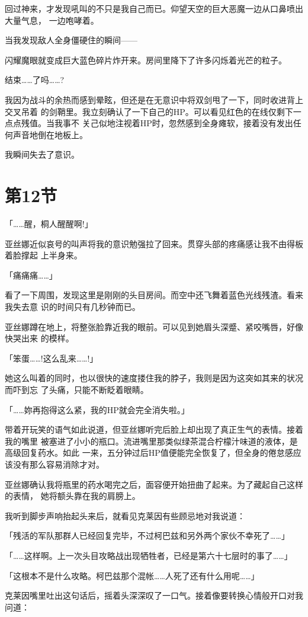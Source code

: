 \documentclass[11pt]{book}
\begin{document}
回过神来，才发现吼叫的不只是我自己而已。仰望天空的巨大恶魔一边从口鼻喷出大量气息，
一边咆哮着。

当我发现敌人全身僵硬住的瞬间——

闪耀魔眼就变成巨大蓝色碎片炸开来。房间里降下了许多闪烁着光芒的粒子。

结束……了吗……?

我因为战斗的余热而感到晕眩，但还是在无意识中将双剑甩了一下，同时收进背上交叉吊着
的剑鞘里。我立刻确认了一下自己的HP。可以看见红色的在线仅剩下一点点残值。当我事不
关己似地注视着HP时，忽然感到全身瘫软，接着没有发出任何声音地倒在地板上。

我瞬间失去了意识。
\section{第12节}
\label{sec:org06a39b8}
「……醒，桐人醒醒啊!」

亚丝娜近似哀号的叫声将我的意识勉强拉了回来。贯穿头部的疼痛感让我不由得板着脸撑起
上半身来。

「痛痛痛……」

看了一下周围，发现这里是刚刚的头目房间。而空中还飞舞着蓝色光线残渣。看来我失去意
识的时间只有几秒钟而已。

亚丝娜蹲在地上，将整张脸靠近我的眼前。可以见到她眉头深蹙、紧咬嘴唇，好像快哭出来
的模样。

「笨蛋……!这么乱来……!」

她这么叫着的同时，也以很快的速度搂住我的脖子，我则是因为这突如其来的状况而吓到忘
了头痛，只能不断眨着眼睛。

「……妳再抱得这么紧，我的HP就会完全消失啦。」

带着开玩笑的语气如此说道，但亚丝娜听完后脸上却出现了真正生气的表情。接着我的嘴里
被塞进了小小的瓶口。流进嘴里那类似绿茶混合柠檬汁味道的液体，是高级回复药水。如此
一来，五分钟过后HP值便能完全恢复了，但全身的倦怠感应该没有那么容易消除才对。

亚丝娜确认我将瓶里的药水喝完之后，面容便开始扭曲了起来。为了藏起自己这样的表情，
她将额头靠在我的肩膀上。

我听到脚步声响抬起头来后，就看见克莱因有些顾忌地对我说道：

「残活的军队那群人已经回复完毕，不过柯巴兹和另外两个家伙不幸死了……」

「……这样啊。上一次头目攻略战出现牺牲者，已经是第六十七层时的事了……」

「这根本不是什么攻略。柯巴兹那个混帐……人死了还有什么用呢……」

克莱因嘴里吐出这句话后，摇着头深深叹了一口气。接着像要转换心情般开口对我问道：
\end{document}

